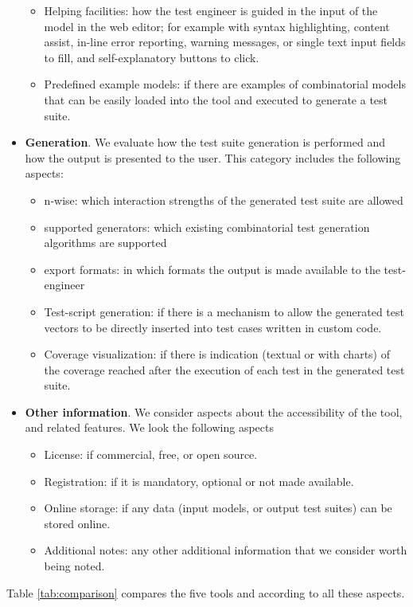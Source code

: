 \begin{tikzborder}{\cite{Gargantini16:validation}}
\begin{tikzborder}{\cite{gargantini_combinatorial_2017}}
\begin{tikzborder}{\cite{garn2019}}
\begin{tikzborder}{\cite{arcaini2019achieving}}
\begin{tikzborder}{}
\begin{itemize}
\begin{itemize}
		\item Helping facilities: how the test engineer is guided in the input of the model in the web editor; for example with syntax highlighting, content assist, in-line error reporting, warning messages, or single text input fields to fill, and self-explanatory buttons to click.
		\item Predefined example models: if there are examples of combinatorial models that can be easily loaded into the tool and executed to generate a test suite.
	\end{itemize} 
	\item \textbf{Generation}. We evaluate how the test suite generation is performed and how the output is presented to the user. This category includes the following aspects:
	\begin{itemize}
		\item n-wise: which interaction strengths of the generated test suite are allowed
		\item supported generators: which existing combinatorial test generation algorithms are supported
		\item export formats: in which formats the output is made available to the test-engineer
		\item Test-script generation: if there is a mechanism to allow the generated test vectors to be directly inserted into test cases written in custom code.
		\item Coverage visualization: if there is indication (textual or with charts) of the coverage reached after the execution of each test in the generated test suite.
	\end{itemize} 
	\item \textbf{Other information}. We consider aspects about the accessibility of the tool, and related features. We look the following aspects
	\begin{itemize}
		\item License: if commercial, free, or open source.
		\item Registration: if it is mandatory, optional or not made available.
		\item Online storage: if any data (input models, or output test suites) can be stored online.
		\item Additional notes: any other additional information that we consider worth being noted.
	\end{itemize} 
\end{itemize}

Table \ref{tab:comparison} compares the five tools and \ctwedge according to all these aspects.


\end{tikzborder}
\end{tikzborder}
\end{tikzborder}
\end{tikzborder}
\end{tikzborder}
